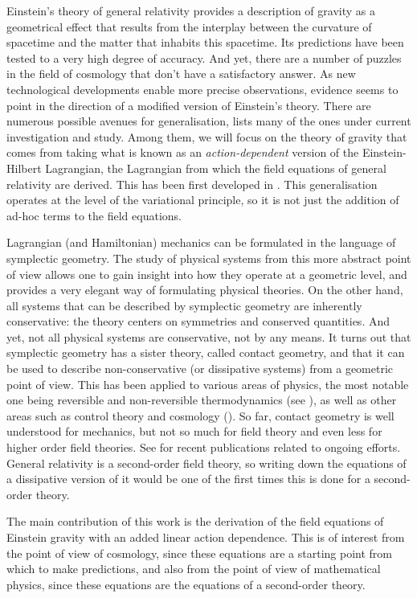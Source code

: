 \documentclass[../main.tex]{subfiles}
\begin{document}
Einstein's theory of general relativity provides a description of gravity as a geometrical
effect that results from the interplay between the curvature of spacetime and the matter
that inhabits this spacetime. Its predictions have been tested to a very high degree of
accuracy. And yet, there are a number of puzzles in the field of cosmology that don't have
a satisfactory answer. As new technological developments enable more precise observations,
evidence seems to point in the direction of a modified version of Einstein's theory. There
are numerous possible avenues for generalisation, \cite{Olmo2020} lists many of the ones
under current investigation and study. Among them, we will focus on the theory of gravity
that comes from taking what is known as an \emph{action-dependent} version of the
Einstein-Hilbert Lagrangian, the Lagrangian from which the field
equations of general relativity are derived. This has been first developed in
\cite{Lazo2017}. This generalisation operates at the level of the
variational principle, so it is not just the addition of ad-hoc terms to the field
equations. 

Lagrangian (and Hamiltonian) mechanics can be formulated in the language of symplectic
geometry. The study of physical systems from this more abstract point of view allows one
to gain insight into how they operate at a geometric level, and provides a very elegant
way of formulating physical theories. On the other hand, all systems that can be described
by symplectic geometry are inherently conservative: the theory centers on symmetries and
conserved quantities. And yet, not all physical systems are conservative, not by any
means. It turns out that symplectic geometry has a sister theory, called contact geometry,
and that it can be used to describe non-conservative (or dissipative systems) from a
geometric point of view. This has been applied to various areas of physics,
the most notable one being reversible and non-reversible thermodynamics (see
\cite{Mrugala1991}), as well as other areas such as control theory and cosmology
(\cite{Lazo2017}). So far, contact geometry is well understood for mechanics, but not so
much for field theory and even less for higher order field theories. See \cite{Gaset2020a,
Leon2021, Gaset2020} for recent publications related to ongoing efforts. General
relativity is a second-order field theory, so writing down the equations of a dissipative
version of it would be one of the first times this is done for a second-order theory. 

The main contribution of this work is the derivation of the field equations of Einstein
gravity with an added linear action dependence. This is of interest from the point of view
of cosmology, since these equations are a starting point from which to make predictions,
and also from the point of view of mathematical physics, since these equations are the
equations of a second-order theory.
\end{document}
